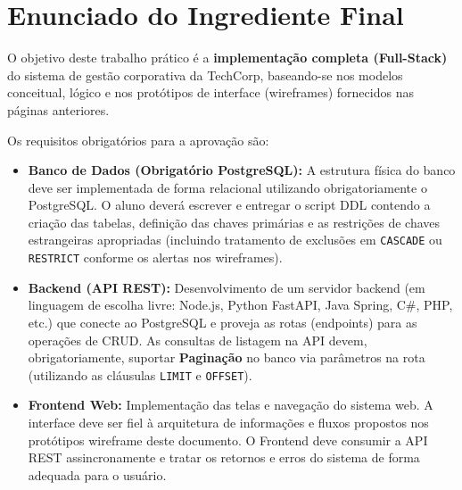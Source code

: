 \documentclass[12pt,a4paper]{article}
\begin{document}
\begin{center}
{%
    }
\end{center}


\vspace{0.4cm}
\section*{Enunciado do Ingrediente Final}

O objetivo deste trabalho prático é a \textbf{implementação completa (Full-Stack)} do sistema de gestão corporativa da TechCorp, baseando-se nos modelos conceitual, lógico e nos protótipos de interface (wireframes) fornecidos nas páginas anteriores. 

Os requisitos obrigatórios para a aprovação são:
\begin{itemize}[leftmargin=*, noitemsep]
    \item \textbf{Banco de Dados (Obrigatório PostgreSQL):} A estrutura física do banco deve ser implementada de forma relacional utilizando obrigatoriamente o PostgreSQL. O aluno deverá escrever e entregar o script DDL contendo a criação das tabelas, definição das chaves primárias e as restrições de chaves estrangeiras apropriadas (incluindo tratamento de exclusões em \texttt{CASCADE} ou \texttt{RESTRICT} conforme os alertas nos wireframes).
    \item \textbf{Backend (API REST):} Desenvolvimento de um servidor backend (em linguagem de escolha livre: Node.js, Python FastAPI, Java Spring, C\#, PHP, etc.) que conecte ao PostgreSQL e proveja as rotas (endpoints) para as operações de CRUD. As consultas de listagem na API devem, obrigatoriamente, suportar \textbf{Paginação} no banco via parâmetros na rota (utilizando as cláusulas \texttt{LIMIT} e \texttt{OFFSET}).
    \item \textbf{Frontend Web:} Implementação das telas e navegação do sistema web. A interface deve ser fiel à arquitetura de informações e fluxos propostos nos protótipos wireframe deste documento. O Frontend deve consumir a API REST assincronamente e tratar os retornos e erros do sistema de forma adequada para o usuário.
\end{itemize}
\end{document}
